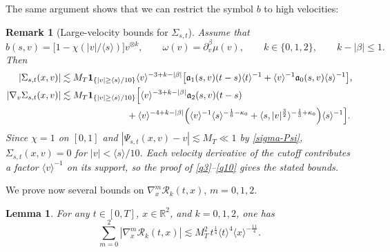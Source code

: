 \documentclass[reqno,11pt]{amsart}
\numberwithin{equation}{section}
\def\R{{\mathbb R}}
\def\R{{\bf R}}
\def\R{\mathbb{R}}
\newtheorem{lemma}[theorem]{Lemma}
\newtheorem{remark}[theorem]{Remark}
\begin{document}
The same argument shows that we can restrict the symbol $b$ to high velocities:

\begin{remark}[Large-velocity bounds for $\Sigma_{s,t}$]
	Assume that
	\[
	b(s,v)=\big[1-\chi(|v|/\langle s\rangle)\big]v^{\otimes k},
	\qquad
	\omega(v)=\partial_v^\beta\mu(v),
	\qquad
	k\in\{0,1,2\},
	\qquad
	k-|\beta|\leq1.
	\]
	Then
	\begin{align}
	|\Sigma_{s,t}(x,v)|
	&\lesssim
	M_T\mathbf 1_{\{|v|\geq\langle s\rangle/10\}}
	\langle v\rangle^{-3+k-|\beta|}\big[
	\mathfrak a_1(s,v)(t-s)\langle t\rangle^{-1}+
	\langle v\rangle^{-1}
	\mathfrak a_0(s,v)\langle s\rangle^{-1}
	\big],\label{q3-largev}\\
	|\nabla_v\Sigma_{s,t}(x,v)|
	&\lesssim
	M_T\mathbf 1_{\{|v|\geq\langle s\rangle/10\}}
	\Big[
	\langle v\rangle^{-3+k-|\beta|}
	\mathfrak a_2(s,v)(t-s)
	\notag\\
	&\hspace{25mm}
	+
	\langle v\rangle^{-4+k-|\beta|}
	\Big(
	\langle v\rangle^{-1}\langle s\rangle^{-\frac16-\kappa_0}
	+
	\langle s,|v|^{\frac32}\rangle^{-\frac13+\kappa_0}
	\Big)
	\langle s\rangle^{-1}
	\Big].
	\label{q10-largev}
	\end{align}
	Since $\chi=1$ on $[0,1]$ and
	$|\Psi_{s,t}(x,v)-v|\lesssim M_T\ll1$ by \eqref{sigma-Psi},
	$\Sigma_{s,t}(x,v)=0$ for $|v|<\langle s\rangle/10$.
	Each velocity derivative of the cutoff contributes a factor
	$\langle v\rangle^{-1}$ on its support, so the proof of
	\eqref{q3}--\eqref{q10} gives the stated bounds.
\end{remark}

	
We prove now several bounds on $\nabla_x^m\mathcal{R}_k(t,x)$, $m=0,1,2$. 

	
	\begin{lemma}\label{Lem1}
	For any $t\in[0,T]$, $x\in\R^2$, and $k=0,1,2$, one has
		\begin{equation}\label{z34b}
			\sum_{m=0}^2
			|\nabla_x^m\mathcal R_k(t,x)|
			\lesssim
			M_T^2\,t^{\frac14}\langle t\rangle^4
			\langle x\rangle^{-\frac{11}{4}}.
		\end{equation}
	\end{lemma}	
	
	
\end{document}
